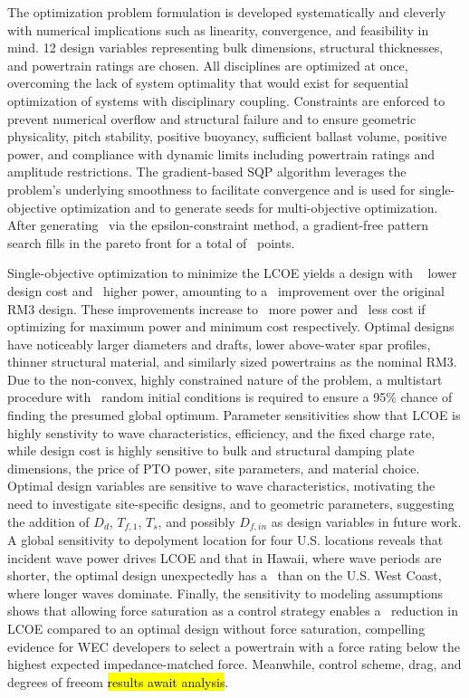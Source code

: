 \documentclass[preprint,12pt]{elsarticle}
\begin{document}
The optimization problem formulation is developed systematically and cleverly with numerical implications such as linearity, convergence, and feasibility in mind.
12 design variables representing bulk dimensions, structural thicknesses, and powertrain ratings are chosen.
All disciplines are optimized at once, overcoming the lack of system optimality that would exist for sequential optimization of systems with disciplinary coupling.
Constraints are enforced to prevent numerical overflow and structural failure and to ensure geometric physicality, pitch stability, positive buoyancy, sufficient ballast volume, positive power, and compliance with dynamic limits including powertrain ratings and amplitude restrictions. 
The gradient-based SQP algorithm leverages the problem's underlying smoothness to facilitate convergence and is used for single-objective optimization and to generate seeds for multi-objective optimization.
After generating \numParetoSeeds~via the epsilon-constraint method, a gradient-free pattern search fills in the pareto front for a total of \numParetoSearchPoints~points.

Single-objective optimization to minimize the LCOE yields a design with \pctImproveDesignCostMinLCOE~ lower design cost and \pctImproveDesignCostMinLCOE~higher power, amounting to a \pctImproveLCOEMinLCOE~improvement over the original RM3 design.
These improvements increase to \pctImprovePowerMaxPower~more power and \pctImproveDesignCostMinCapex~less cost if optimizing for maximum power and minimum cost respectively. 
Optimal designs have noticeably larger diameters and drafts, lower above-water spar profiles, thinner structural material, and similarly sized powertrains as the nominal RM3.
Due to the non-convex, highly constrained nature of the problem, a multistart procedure with \numMultistartRequired~random initial conditions is required to ensure a 95\% chance of finding the presumed global optimum.
Parameter sensitivities show that LCOE is highly senstivity to wave characteristics, efficiency, and the fixed charge rate, while design cost is highly sensitive to bulk and structural damping plate dimensions, the price of PTO power, site parameters, and material choice.
Optimal design variables are sensitive to wave characteristics, motivating the need to investigate site-specific designs, and to geometric parameters, suggesting the addition of $D_d$, $T_{f,1}$, $T_s$, and possibly $D_{f,in}$ as design variables in future work.
A global sensitivity to depolyment location for four U.S. locations reveals that incident wave power drives LCOE and that in Hawaii, where wave periods are shorter, the optimal design unexpectedly has a \HawaiiDesignCharacteristics~than on the U.S. West Coast, where longer waves dominate. 
Finally, the sensitivity to modeling assumptions shows that allowing force saturation as a control strategy enables a \pctImproveLCOEForceSatOptMinLCOE~reduction in LCOE compared to an optimal design without force saturation, compelling evidence for WEC developers to select a powertrain with a force rating below the highest expected impedance-matched force.
Meanwhile, control scheme, drag, and degrees of freeom \hl{results await analysis}.
\end{document}
